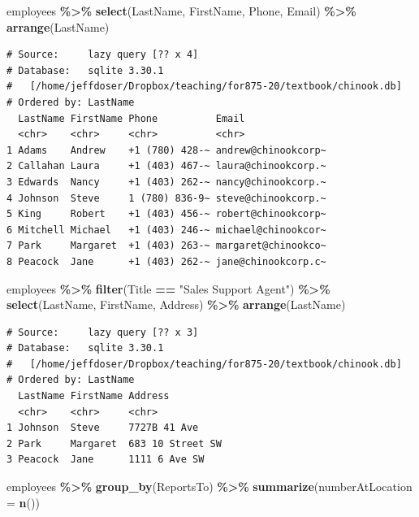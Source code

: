 \documentclass[
]{krantz}
\makeatletter
\newenvironment{Shaded}{\begin{snugshade}}{\end{snugshade}}
\newcommand{\DataTypeTok}[1]{\textcolor[rgb]{0.27,0.27,0.27}{#1}}
\newcommand{\KeywordTok}[1]{\textcolor[rgb]{0.27,0.27,0.27}{\textbf{#1}}}
\newcommand{\NormalTok}[1]{#1}
\newcommand{\OperatorTok}[1]{\textcolor[rgb]{0.43,0.43,0.43}{\textbf{#1}}}
\newcommand{\StringTok}[1]{\textcolor[rgb]{0.5,0.5,0.5}{#1}}
\newenvironment{kframe}{%
\medskip{}
\setlength{\fboxsep}{.8em}
 \def\at@end@of@kframe{}%
 \ifinner\ifhmode%
  \def\at@end@of@kframe{\end{minipage}}%
  \begin{minipage}{\columnwidth}%
 \fi\fi%
 \def\FrameCommand##1{\hskip\@totalleftmargin \hskip-\fboxsep
 \colorbox{shadecolor}{##1}\hskip-\fboxsep
     \hskip-\linewidth \hskip-\@totalleftmargin \hskip\columnwidth}%
 \MakeFramed {\advance\hsize-\width
   \@totalleftmargin\z@ \linewidth\hsize
   \@setminipage}}%
 {\par\unskip\endMakeFramed%
 \at@end@of@kframe}
\renewenvironment{Shaded}{\begin{kframe}}{\end{kframe}}
\makeatother
\begin{document}
\begin{Shaded}
\begin{Highlighting}[]
\NormalTok{employees }\OperatorTok{\%\textgreater{}\%}\StringTok{ }
\StringTok{  }\KeywordTok{select}\NormalTok{(LastName, FirstName, Phone, Email) }\OperatorTok{\%\textgreater{}\%}\StringTok{ }
\StringTok{  }\KeywordTok{arrange}\NormalTok{(LastName)}
\end{Highlighting}
\end{Shaded}

\begin{verbatim}
# Source:     lazy query [?? x 4]
# Database:   sqlite 3.30.1
#   [/home/jeffdoser/Dropbox/teaching/for875-20/textbook/chinook.db]
# Ordered by: LastName
  LastName FirstName Phone          Email              
  <chr>    <chr>     <chr>          <chr>              
1 Adams    Andrew    +1 (780) 428-~ andrew@chinookcorp~
2 Callahan Laura     +1 (403) 467-~ laura@chinookcorp.~
3 Edwards  Nancy     +1 (403) 262-~ nancy@chinookcorp.~
4 Johnson  Steve     1 (780) 836-9~ steve@chinookcorp.~
5 King     Robert    +1 (403) 456-~ robert@chinookcorp~
6 Mitchell Michael   +1 (403) 246-~ michael@chinookcor~
7 Park     Margaret  +1 (403) 263-~ margaret@chinookco~
8 Peacock  Jane      +1 (403) 262-~ jane@chinookcorp.c~
\end{verbatim}

\begin{Shaded}
\begin{Highlighting}[]
\NormalTok{employees }\OperatorTok{\%\textgreater{}\%}\StringTok{ }
\StringTok{  }\KeywordTok{filter}\NormalTok{(Title }\OperatorTok{==}\StringTok{ "Sales Support Agent"}\NormalTok{) }\OperatorTok{\%\textgreater{}\%}\StringTok{ }
\StringTok{  }\KeywordTok{select}\NormalTok{(LastName, FirstName, Address) }\OperatorTok{\%\textgreater{}\%}\StringTok{ }
\StringTok{  }\KeywordTok{arrange}\NormalTok{(LastName)}
\end{Highlighting}
\end{Shaded}

\begin{verbatim}
# Source:     lazy query [?? x 3]
# Database:   sqlite 3.30.1
#   [/home/jeffdoser/Dropbox/teaching/for875-20/textbook/chinook.db]
# Ordered by: LastName
  LastName FirstName Address         
  <chr>    <chr>     <chr>           
1 Johnson  Steve     7727B 41 Ave    
2 Park     Margaret  683 10 Street SW
3 Peacock  Jane      1111 6 Ave SW   
\end{verbatim}

\begin{Shaded}
\begin{Highlighting}[]
\NormalTok{employees }\OperatorTok{\%\textgreater{}\%}\StringTok{ }
\StringTok{  }\KeywordTok{group\_by}\NormalTok{(ReportsTo) }\OperatorTok{\%\textgreater{}\%}\StringTok{ }
\StringTok{  }\KeywordTok{summarize}\NormalTok{(}\DataTypeTok{numberAtLocation =} \KeywordTok{n}\NormalTok{())}
\end{Highlighting}
\end{Shaded}
\end{document}
